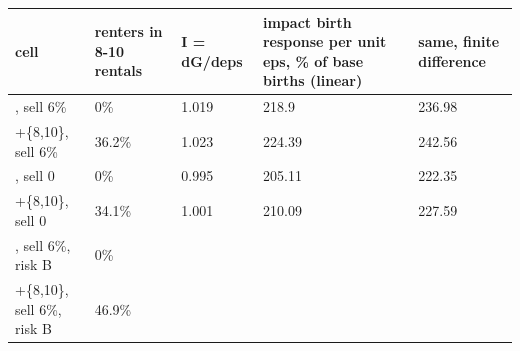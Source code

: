 \begingroup\small
\setlength{\tabcolsep}{3pt}
\renewcommand{\arraystretch}{1.04}
\begin{tabularx}{\linewidth}{XXXXX}
\toprule
cell & renters in 8-10 rentals & I = dG/deps & impact birth response per unit eps, \% of base births (linear) & same, finite difference \\
\midrule
[0,6], sell 6\% & 0\% & 1.019 & 218.9 & 236.98 \\
[0,6]+\{8,10\}, sell 6\% & 36.2\% & 1.023 & 224.39 & 242.56 \\
[0,6], sell 0 & 0\% & 0.995 & 205.11 & 222.35 \\
[0,6]+\{8,10\}, sell 0 & 34.1\% & 1.001 & 210.09 & 227.59 \\
[0,6], sell 6\%, risk B & 0\% &  &  &  \\
[0,6]+\{8,10\}, sell 6\%, risk B & 46.9\% &  &  &  \\
\bottomrule
\end{tabularx}
\endgroup
